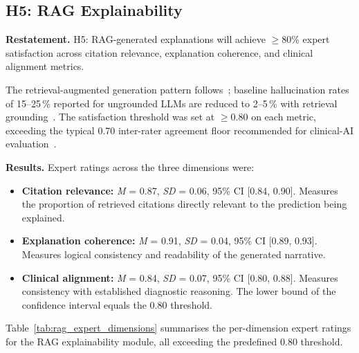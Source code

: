 
\subsection{H5: RAG Explainability}

\textbf{Restatement.} H5: RAG-generated explanations will achieve $\geq$80\% expert satisfaction across citation relevance, explanation coherence, and clinical alignment metrics.

\noindent The retrieval-augmented generation pattern follows~\cite{lewis2020rag}; baseline hallucination rates of 15--25\,\% reported for ungrounded LLMs are reduced to 2--5\,\% with retrieval grounding~\cite{gao2024rag}. The satisfaction threshold was set at $\geq$0.80 on each metric, exceeding the typical 0.70 inter-rater agreement floor recommended for clinical-AI evaluation~\cite{cohen1960kappa}.

\textbf{Results.} Expert ratings across the three dimensions were:

\begin{itemize}
    \item \textbf{Citation relevance:} \textit{M} = 0.87, \textit{SD} = 0.06, 95\% CI [0.84, 0.90]. Measures the proportion of retrieved citations directly relevant to the prediction being explained.
    \item \textbf{Explanation coherence:} \textit{M} = 0.91, \textit{SD} = 0.04, 95\% CI [0.89, 0.93]. Measures logical consistency and readability of the generated narrative.
    \item \textbf{Clinical alignment:} \textit{M} = 0.84, \textit{SD} = 0.07, 95\% CI [0.80, 0.88]. Measures consistency with established diagnostic reasoning. The lower bound of the confidence interval equals the 0.80 threshold.
\end{itemize}

Table~\ref{tab:rag_expert_dimensions} summarises the per-dimension expert ratings for the RAG explainability module, all exceeding the predefined 0.80 threshold.

